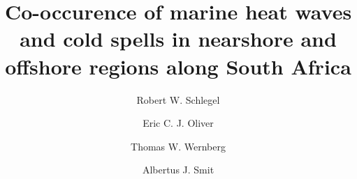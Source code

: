 \documentclass[a4paper,10pt,review]{elsarticle}
\begin{document}
\begin{frontmatter}

\title{Co-occurence of marine heat waves and cold spells in nearshore and offshore regions along South Africa}

\author[firstaddress]{Robert W. Schlegel}

\author[secondaddress,thirdaddress]{Eric C. J. Oliver}
\author[fourthaddress]{Thomas W. Wernberg}
\author[firstaddress]{Albertus J. Smit}


\address[firstaddress]{Department of Biodiversity and Conservation Biology, University of the Western Cape, Private Bag X17, Bellville 7535, South Africa}

\address[secondaddress]{ARC Centre of Excellence for Climate System Science, The University of New South Wales, Sydney, Australia}

\address[thirdaddress]{Institute for Marine and Antarctic Studies, University of Tasmania, Hobart, Australia}

\address[fourthaddress]{UWA Oceans Institute and School of Plant Biology, The University of Western Australia, Crawley, 6009 Western Australia, Australia}


\end{frontmatter}
\end{document}
